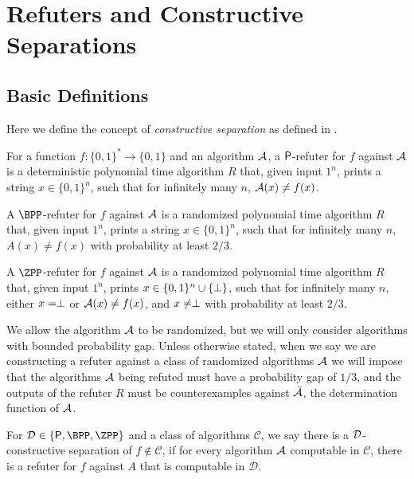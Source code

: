 \section{Refuters and Constructive Separations}

\subsection{Basic Definitions}

Here we define the concept of \emph{constructive separation} as defined in \cite{ConstructiveSeparations}.

\begin{definition}
	\label{def:refuter}
	For a function $f \colon \{0, 1\}^* \to \{0, 1\}$ and an algorithm $\mathcal{A}$, 
	a $\mathsf{P}$-refuter for $f$ against $\mathcal{A}$ is a deterministic polynomial time
	algorithm $R$ that, given input $1^n$, prints a string $x \in \{0, 1\}^n$,
	such that for infinitely many $n$, $\mathcal{A}(x) \neq f(x)$.
	
	A $\BPP$-refuter for $f$ against $\mathcal{A}$ is a randomized polynomial time algorithm
	$R$ that, given input $1^n$, prints a string $x \in \{0, 1\}^n$, such that 
	for infinitely many $n$, $A(x) \neq f(x)$ with probability at least $2/3$.

	A $\ZPP$-refuter for $f$ against $\mathcal{A}$ is a randomized polynomial time algorithm $R$
	that, given input $1^n$, prints $x \in \{0, 1\}^n \cup \{\perp\}$, such that for 
	infinitely many $n$, either $x = \perp$ or $\mathcal{A}(x) \neq f(x)$, and $x \neq \perp$ with
	probability at least $2/3$. 
\end{definition}

We allow the algorithm $\mathcal{A}$ to be randomized, but we will only consider algorithms with bounded 
probability gap. Unless otherwise stated, when we say we are constructing a refuter against a 
class of randomized algorithms $\mathcal{A}$ we will impose that the algorithms $\mathcal{A}$ being refuted 
must have a probability gap of $1/3$, and the outputs of the refuter $R$ must be counterexamples
against $\bar{\mathcal{A}}$, the determination function of $\mathcal{A}$. 

\begin{definition}
	\label{def:constructiveseparation}
	For $\calD \in \{\PTIME, \BPP, \ZPP\}$ and a class of algorithms $\mathcal{C}$, we say there is a 
	$\mathcal{D}$-constructive separation of $f \not\in \mathcal{C}$, if for every algorithm $\mathcal{A}$ computable
	in $\mathcal{C}$, there is a refuter for $f$ against $A$ that is computable in $\mathcal{D}$. 
\end{definition}

